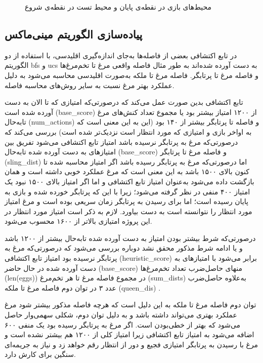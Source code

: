 \documentclass[11pt, a4paper, oneside]{article}
\begin{document}
\begin{figure}[H]
   	\caption{محیط‌های بازی در نقطه‌ی پایان و محیط تست در نقطه‌ی شروع}
   	\label{grids}
   	
   \end{figure}
   
\subsection{پیاده‌سازی الگوریتم مینی‌ماکس}
در تابع اکتشافی بعضی از فاصله‌ها به‌جای اندازه‌گیری اقلیدسی، با استفاده از دو الگوریتم bfs و ucs  به دست آورده شده‌اند به طور مثال فاصله واقعی مرغ تا تخم‌مرغ‌ها و فاصله مرغ تا پرتابگر.
فاصله مرغ تا ملکه به‌صورت اقلیدسی محاسبه می‌شود به دلیل عملکرد بهتر مرغ نسبت به سایر روش‌های محاسبه فاصله.

تابع اکتشافی بدین صورت عمل می‌کند که درصورتی‌که امتیازی که تا الان به دست آورده شده است (base\_score) از ۱۲۰۰ امتیاز بیشتر بود یا مجموع تعداد کنش‌های مرغ تابه‌حال (num\_actions) و فاصله تا پرتابگر بیشتر از ۱۴۰ بود (این به این معنی است که به اواخر بازی و امتیازی که مورد انتظار است نزدیک‌تر شده است) 
بررسی می‌کند که درصورتی‌که مرغ به پرتابگر نرسیده باشد امتیاز تابع اکتشافی می‌شود تفریق بین امتیازهای به دست آورده شده تابه‌حال (base\_score) و فاصله مرغ تا پرتابگر (sling\_dist) 
اما درصورتی‌که مرغ به پرتابگر رسیده باشد اگر امتیاز محاسبه شده تا کنون بالای ۱۵۰۰ باشد به این معنی است که مرغ عملکرد خوبی داشته است و همان بازگشت داده می‌شود به‌عنوان امتیاز تابع اکتشافی و اما اگر امتیاز بالای ۱۵۰۰ نبود یک امتیاز ۴۰۰ منفی در نظر گرفته می‌شود؛ زیرا با این که پرتابگر خورده شده و بازی به پایان رسیده است؛ اما برای رسیدن به پرتابگر زمان سریعی بوده است و مرغ امتیاز مورد انتظار را نتوانسته است به دست بیاورد. لازم به ذکر است امتیاز مورد انتظار در این پروژه امتیازی بالاتر از ۱۶۰۰ محسوب می‌شود.

درصورتی‌که شرط بیشتر بودن امتیاز به دست آورده شده تابه‌حال بیشتر از ۱۲۰۰ باشد و یا ادامه شرط مذکور محقق نشد دوباره بررسی می‌شود که درصورتی‌که مرغ به پرتابگر نرسیده بود امتیاز تابع اکتشافی (heuristic\_score) برابر می‌شود با امتیازهای به دست آورده شده در حال حاضر (base\_score) منهای حاصل‌ضرب تعداد تخم‌مرغ‌ها (len(eggs)) در مجموع فاصله مرغ تا هر تخم‌مرغ (sum\_dists) به‌علاوه حاصل‌ضرب عدد ۳ در توان دوم فاصله مرغ تا ملکه (queen\_dis) .

توان دوم فاصله مرغ تا ملکه به این دلیل است که هرچه فاصله مذکور بیشتر شود مرغ عملکرد بهتری می‌تواند داشته باشد و به دلیل توان دوم، شکلی سهمی‌وار حاصل می‌شود که بهتر از خطی‌بودن است.
اگر مرغ به پرتابگر رسیده بود یک منفی ۶۰۰ اضافه می‌شود به امتیاز تابع اکتشافی زیرا امتیاز کلی از ۱۲۰۰ هم بیشتر نشده است و مرغ با رسیدن به پرتابگر امتیازی فجیع و دور از انتظار رقم خواهد زد و نیاز به جریمه‌ای سنگین برای کارش دارد.
\end{document}
